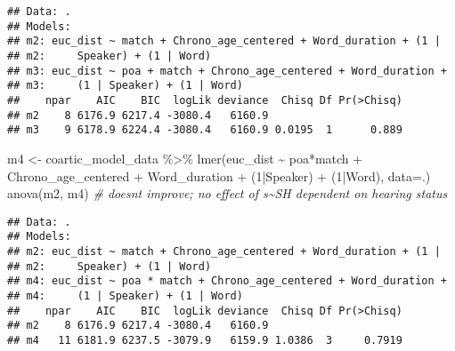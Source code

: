 \documentclass[
]{article}
\newenvironment{Shaded}{\begin{snugshade}}{\end{snugshade}}
\newcommand{\AttributeTok}[1]{\textcolor[rgb]{0.77,0.63,0.00}{#1}}
\newcommand{\CommentTok}[1]{\textcolor[rgb]{0.56,0.35,0.01}{\textit{#1}}}
\newcommand{\DecValTok}[1]{\textcolor[rgb]{0.00,0.00,0.81}{#1}}
\newcommand{\FunctionTok}[1]{\textcolor[rgb]{0.00,0.00,0.00}{#1}}
\newcommand{\NormalTok}[1]{#1}
\newcommand{\OtherTok}[1]{\textcolor[rgb]{0.56,0.35,0.01}{#1}}
\newcommand{\SpecialCharTok}[1]{\textcolor[rgb]{0.00,0.00,0.00}{#1}}
\begin{document}
\begin{verbatim}
## Data: .
## Models:
## m2: euc_dist ~ match + Chrono_age_centered + Word_duration + (1 | 
## m2:     Speaker) + (1 | Word)
## m3: euc_dist ~ poa + match + Chrono_age_centered + Word_duration + 
## m3:     (1 | Speaker) + (1 | Word)
##    npar    AIC    BIC  logLik deviance  Chisq Df Pr(>Chisq)
## m2    8 6176.9 6217.4 -3080.4   6160.9                     
## m3    9 6178.9 6224.4 -3080.4   6160.9 0.0195  1      0.889
\end{verbatim}

\begin{Shaded}
\begin{Highlighting}[]
\NormalTok{m4 }\OtherTok{\textless{}{-}}\NormalTok{ coartic\_model\_data }\SpecialCharTok{\%\textgreater{}\%}
  \FunctionTok{lmer}\NormalTok{(euc\_dist }\SpecialCharTok{\textasciitilde{}}\NormalTok{ poa}\SpecialCharTok{*}\NormalTok{match }\SpecialCharTok{+} 
\NormalTok{         Chrono\_age\_centered }\SpecialCharTok{+} 
\NormalTok{         Word\_duration }\SpecialCharTok{+} 
\NormalTok{         (}\DecValTok{1}\SpecialCharTok{|}\NormalTok{Speaker) }\SpecialCharTok{+} 
\NormalTok{         (}\DecValTok{1}\SpecialCharTok{|}\NormalTok{Word), }
       \AttributeTok{data=}\NormalTok{.) }
\FunctionTok{anova}\NormalTok{(m2, m4) }\CommentTok{\# doesn\textquotesingle{}t improve; no effect of s\textasciitilde{}SH dependent on hearing status }
\end{Highlighting}
\end{Shaded}

\begin{verbatim}
## Data: .
## Models:
## m2: euc_dist ~ match + Chrono_age_centered + Word_duration + (1 | 
## m2:     Speaker) + (1 | Word)
## m4: euc_dist ~ poa * match + Chrono_age_centered + Word_duration + 
## m4:     (1 | Speaker) + (1 | Word)
##    npar    AIC    BIC  logLik deviance  Chisq Df Pr(>Chisq)
## m2    8 6176.9 6217.4 -3080.4   6160.9                     
## m4   11 6181.9 6237.5 -3079.9   6159.9 1.0386  3     0.7919
\end{verbatim}
\end{document}
